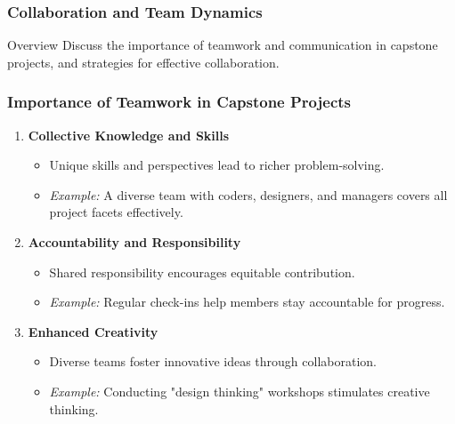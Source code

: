 \documentclass{beamer}
\begin{document}
\begin{frame}[fragile]
    \frametitle{Collaboration and Team Dynamics}
    \begin{block}{Overview}
        Discuss the importance of teamwork and communication in capstone projects, and strategies for effective collaboration.
    \end{block}
\end{frame}

\begin{frame}[fragile]
    \frametitle{Importance of Teamwork in Capstone Projects}
    \begin{enumerate}
        \item \textbf{Collective Knowledge and Skills}
            \begin{itemize}
                \item Unique skills and perspectives lead to richer problem-solving.
                \item \textit{Example:} A diverse team with coders, designers, and managers covers all project facets effectively.
            \end{itemize}

        \item \textbf{Accountability and Responsibility}
            \begin{itemize}
                \item Shared responsibility encourages equitable contribution.
                \item \textit{Example:} Regular check-ins help members stay accountable for progress.
            \end{itemize}

        \item \textbf{Enhanced Creativity}
            \begin{itemize}
                \item Diverse teams foster innovative ideas through collaboration.
                \item \textit{Example:} Conducting "design thinking" workshops stimulates creative thinking.
            \end{itemize}
    \end{enumerate}
\end{frame}
\end{document}
